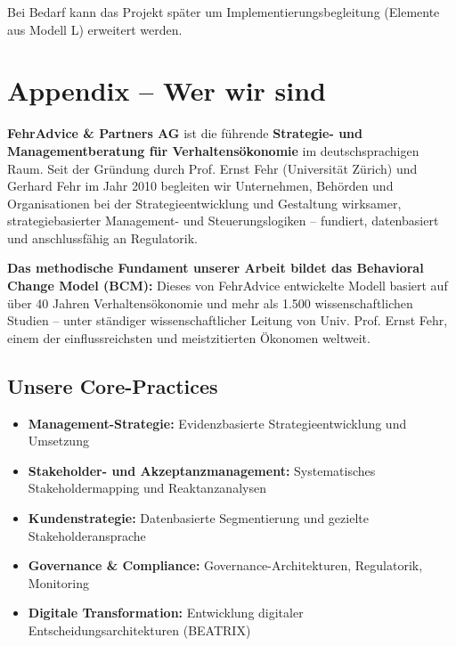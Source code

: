 \documentclass[11pt,a4paper]{article}
\begin{document}
Bei Bedarf kann das Projekt später um Implementierungsbegleitung (Elemente aus Modell L) erweitert werden.

\newpage

\section*{Appendix -- Wer wir sind}

\textbf{FehrAdvice \& Partners AG} ist die führende \textbf{Strategie- und Managementberatung für Verhaltensökonomie} im deutschsprachigen Raum. Seit der Gründung durch Prof. Ernst Fehr (Universität Zürich) und Gerhard Fehr im Jahr 2010 begleiten wir Unternehmen, Behörden und Organisationen bei der Strategieentwicklung und Gestaltung wirksamer, strategiebasierter Management- und Steuerungslogiken -- fundiert, datenbasiert und anschlussfähig an Regulatorik.

\textbf{Das methodische Fundament unserer Arbeit bildet das Behavioral Change Model (BCM):} Dieses von FehrAdvice entwickelte Modell basiert auf über 40 Jahren Verhaltensökonomie und mehr als 1.500 wissenschaftlichen Studien -- unter ständiger wissenschaftlicher Leitung von Univ. Prof. Ernst Fehr, einem der einflussreichsten und meistzitierten Ökonomen weltweit.

\subsection*{Unsere Core-Practices}

\begin{itemize}
    \item \textbf{Management-Strategie:} Evidenzbasierte Strategieentwicklung und Umsetzung
    \item \textbf{Stakeholder- und Akzeptanzmanagement:} Systematisches Stakeholdermapping und Reaktanzanalysen
    \item \textbf{Kundenstrategie:} Datenbasierte Segmentierung und gezielte Stakeholderansprache
    \item \textbf{Governance \& Compliance:} Governance-Architekturen, Regulatorik, Monitoring
    \item \textbf{Digitale Transformation:} Entwicklung digitaler Entscheidungsarchitekturen (BEATRIX)
\end{itemize}
\end{document}
